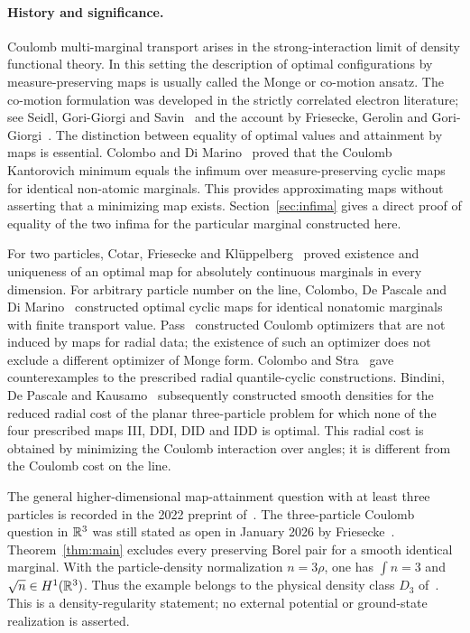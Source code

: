 \paragraph{History and significance.}
Coulomb multi-marginal transport arises in the strong-interaction
limit of density functional theory. In this setting the description
of optimal configurations by measure-preserving maps is usually
called the Monge or co-motion ansatz. The co-motion formulation was
developed in the strictly correlated electron literature; see Seidl,
Gori-Giorgi and Savin~\cite{SGS2007} and the account by Friesecke,
Gerolin and Gori-Giorgi~\cite{FGG2023}.
The distinction between equality of optimal values and attainment
by maps is essential. Colombo and Di Marino~\cite[author version, Theorem~1.1]{CDM2015} proved
that the Coulomb Kantorovich minimum equals the infimum over
measure-preserving cyclic maps for identical non-atomic marginals.
This provides approximating maps without asserting that a
minimizing map exists. Section~\ref{sec:infima} gives a direct proof of
equality of the two infima for the particular marginal constructed here.

For two particles, Cotar, Friesecke and
Kl{\"u}ppelberg~\cite[arXiv version, Theorem~3.6]{CFK2013}
proved existence and uniqueness of an optimal map for absolutely
continuous marginals in every dimension. For arbitrary particle number
on the line, Colombo, De Pascale and Di Marino~\cite[Theorem~1.1]{CDDM2015}
constructed optimal cyclic maps for identical nonatomic marginals with
finite transport value. Pass~\cite{Pass2013} constructed Coulomb
optimizers that are not induced by maps for radial data; the existence
of such an optimizer does not exclude a different optimizer of Monge
form. Colombo and Stra~\cite{CS2016} gave counterexamples to the
prescribed radial quantile-cyclic constructions. Bindini, De Pascale and
Kausamo~\cite{BDK2022} subsequently constructed smooth densities for
the reduced radial cost of the planar three-particle problem for which
none of the four prescribed maps III, DDI, DID and IDD is optimal.
This radial cost is obtained by minimizing the Coulomb interaction over
angles; it is different from the Coulomb cost on the line.

The general higher-dimensional map-attainment question with at least
three particles is recorded in the 2022 preprint
of~\cite[arXiv version, Theorem~2.4 and the following discussion]{FGG2023}.
The three-particle Coulomb question in \(\mathbb R^3\) was still stated as open
in January 2026 by Friesecke~\cite[Section~3.2]{Friesecke2026}.
Theorem~\ref{thm:main} excludes every preserving Borel pair for a smooth
identical marginal. With the particle-density normalization \(n=3\rho\),
one has \(\int n=3\) and \(\sqrt n\in H^1(\mathbb R^3)\). Thus the example
belongs to the physical density class \(D_3\)
of~\cite[arXiv version, Eq.~(12)]{FGG2023}. This is a density-regularity
statement; no external potential or ground-state realization is asserted.

